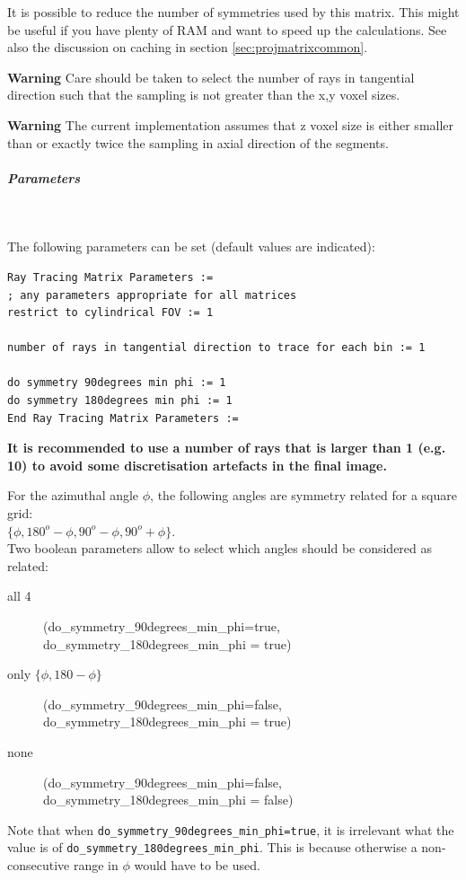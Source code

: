 \documentclass{article}
\newcommand{\subsubsubsubsection}[1]{\subparagraph{#1} \mbox{} \\}
\begin{document}
{{It is possible to reduce the number of symmetries used by this 
matrix. This might be useful if you have plenty of RAM and want 
to speed up the calculations. See also the discussion on caching 
in section \ref{sec:projmatrixcommon}.

\textbf{Warning} Care should be taken to select the number of rays 
in tangential direction such that the sampling is not greater 
than the x,y voxel sizes.

\textbf{Warning} The current implementation assumes that z voxel size 
is either smaller than or exactly twice the sampling in axial 
direction of the segments.

{ \subsubsubsubsection{Parameters}
}
The following parameters can be set (default values are indicated):
\begin{verbatim}
Ray Tracing Matrix Parameters := 
; any parameters appropriate for all matrices
restrict to cylindrical FOV := 1

number of rays in tangential direction to trace for each bin := 1

do symmetry 90degrees min phi := 1 
do symmetry 180degrees min phi := 1
End Ray Tracing Matrix Parameters :=
\end{verbatim}

\textbf{It is recommended to use a number of rays that is larger than 1 (e.g. 10) to
avoid some discretisation artefacts in the final image.}

For the azimuthal angle $\phi$, the following angles are symmetry 
related for a square grid: \\
$\{\phi, 180^{o}-\phi, 90^{o}-\phi, 90^{o}+\phi\}$.\\
Two boolean parameters allow to select which angles should be 
considered as related:
\begin{description}
\item[all 4]
  (do\_symmetry\_90degrees\_min\_phi=true,  \\
do\_symmetry\_180degrees\_min\_phi = true)
\item[only $\{ \phi, 180- \phi \}$]
(do\_symmetry\_90degrees\_min\_phi=false,  \\
do\_symmetry\_180degrees\_min\_phi = true)
\item[none]
(do\_symmetry\_90degrees\_min\_phi=false, \\
do\_symmetry\_180degrees\_min\_phi = false)
\end{description}

Note that when \texttt{do\_symmetry\_90degrees\_min\_phi=true}, 
it is irrelevant what the value is 
of \texttt{do\_symmetry\_180degrees\_min\_phi}. This is because 
otherwise a non-consecutive range in $\phi$ would have to be used.


}}
\end{document}
